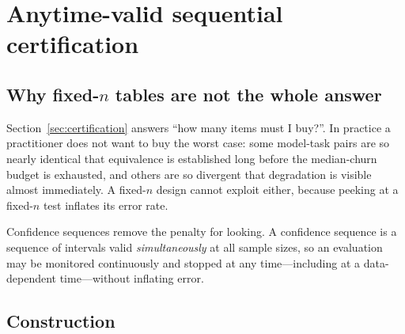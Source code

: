 %

\section{Anytime-valid sequential certification}
\label{sec:sequential}

\subsection{Why fixed-$n$ tables are not the whole answer}

Section~\ref{sec:certification} answers ``how many items must I buy?''. In
practice a practitioner does not want to buy the worst case: some model-task
pairs are so nearly identical that equivalence is established long before the
median-churn budget is exhausted, and others are so divergent that degradation is
visible almost immediately. A fixed-$n$ design cannot exploit either, because
peeking at a fixed-$n$ test inflates its error rate.

Confidence sequences remove the penalty for looking. A confidence sequence is a
sequence of intervals valid \emph{simultaneously} at all sample sizes, so an
evaluation may be monitored continuously and stopped at any time---including at a
data-dependent time---without inflating error.

\subsection{Construction}



